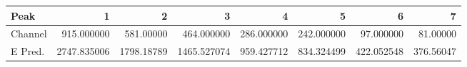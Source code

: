 \begin{tabular}{lrrrrrrr}
\toprule
Peak &            1 &           2 &            3 &           4 &           5 &           6 &          7 \\
\midrule
Channel &   915.000000 &   581.00000 &   464.000000 &  286.000000 &  242.000000 &   97.000000 &   81.00000 \\
E Pred. &  2747.835006 &  1798.18789 &  1465.527074 &  959.427712 &  834.324499 &  422.052548 &  376.56047 \\
\bottomrule
\end{tabular}
